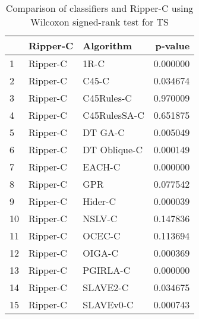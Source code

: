 \begin{table}
\footnotesize
\caption{Comparison of classifiers and Ripper-C using Wilcoxon signed-rank test for TS}
\label{tab:Ripper-C wilcoxon TS comparison}
\begin{tabular}{lllr}
\hline
 & Ripper-C & Algorithm & p-value \\
\hline
1 & Ripper-C & 1R-C & 0.000000 \\
2 & Ripper-C & C45-C & 0.034674 \\
3 & Ripper-C & C45Rules-C & 0.970009 \\
4 & Ripper-C & C45RulesSA-C & 0.651875 \\
5 & Ripper-C & DT GA-C & 0.005049 \\
6 & Ripper-C & DT Oblique-C & 0.000149 \\
7 & Ripper-C & EACH-C & 0.000000 \\
8 & Ripper-C & GPR & 0.077542 \\
9 & Ripper-C & Hider-C & 0.000039 \\
10 & Ripper-C & NSLV-C & 0.147836 \\
11 & Ripper-C & OCEC-C & 0.113694 \\
12 & Ripper-C & OIGA-C & 0.000369 \\
13 & Ripper-C & PGIRLA-C & 0.000000 \\
14 & Ripper-C & SLAVE2-C & 0.034675 \\
15 & Ripper-C & SLAVEv0-C & 0.000743 \\
\hline
\end{tabular}
\end{table}
